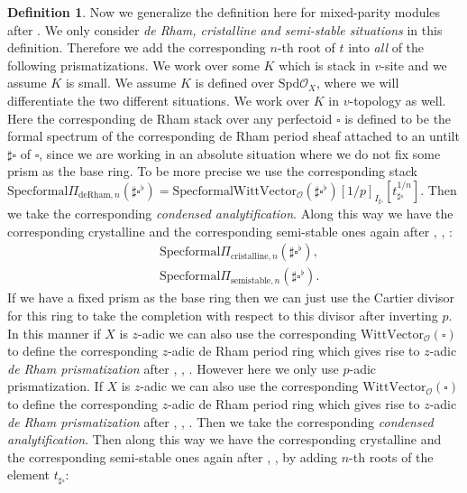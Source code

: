 \documentclass[12pt]{article}
\theoremstyle{definition}
\newtheorem{definition}{Definition}
\begin{document}
\begin{definition}
Now we generalize the definition here for mixed-parity modules after \cite{BS}. We only consider \textit{de Rham, cristalline and semi-stable situations} in this definition. Therefore we add the corresponding $n$-th root of $t$ into \textit{all} of the following prismatizations. We work over some $K$ which is stack in $v$-site and we assume $K$ is small. We assume $K$ is defined over $\mathrm{Spd}\mathcal{O}_X$, where we will differentiate the two different situations. We work over $K$ in $v$-topology as well. Here the corresponding de Rham stack over any perfectoid $\square$ is defined to be the formal spectrum of the corresponding de Rham period sheaf attached to an untilt $\sharp\square$ of $\square$, since we are working in an absolute situation where we do not fix some prism as the base ring. To be more precise we use the corresponding stack $\mathrm{Specformal}\Pi_{\mathrm{deRham},n}(\sharp\square^\flat)=\mathrm{Specformal}\mathrm{WittVector}_\mathcal{O}(\sharp\square^\flat)[1/p]_{I_{\sharp\square}}[t_{\sharp\square}^{1/n}]$. Then we take the corresponding \textit{condensed analytification}. Along this way we have the corresponding crystalline and the corresponding semi-stable ones again after \cite{BS2}, \cite{BLA}, \cite{DC}:
\begin{align}
&\mathrm{Specformal}\Pi_{\mathrm{cristalline},n}(\sharp\square^\flat),\\
&\mathrm{Specformal}\Pi_{\mathrm{semistable},n}(\sharp\square^\flat).
\end{align}
If we have a fixed prism as the base ring then we can just use the Cartier divisor for this ring to take the completion with respect to this divisor after inverting $p$. In this manner if $X$ is $z$-adic we can also use the corresponding $\mathrm{WittVector}_\mathcal{O}(\square)$ to define the corresponding $z$-adic de Rham period ring which gives rise to $z$-adic \textit{de Rham prismatization} after \cite{BS2}, \cite{BLA}, \cite{DC}. However here we only use $p$-adic prismatization. If $X$ is $z$-adic we can also use the corresponding $\mathrm{WittVector}_\mathcal{O}(\square)$ to define the corresponding $z$-adic de Rham period ring which gives rise to $z$-adic \textit{de Rham prismatization} after \cite{BS2}, \cite{BLA}, \cite{DC}. Then we take the corresponding \textit{condensed analytification}. Then along this way we have  the corresponding crystalline and the corresponding semi-stable ones again after \cite{BS2}, \cite{BLA}, \cite{DC} by adding $n$-th roots of the element $t_{\sharp\square}$:

\end{definition}
\end{document}
